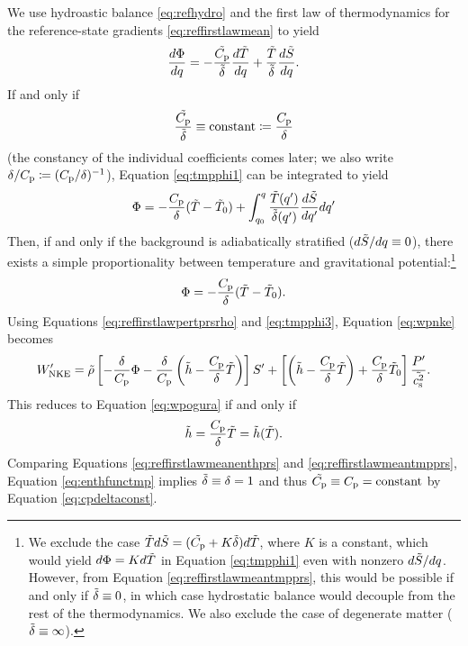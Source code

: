 \documentclass[12pt]{article}
\newcommand{\wpnke}{W^\prime_{\rm NKE}}
\begin{document}
We use hydroastic balance \eqref{eq:refhydro} and the first law of thermodynamics for the reference-state gradients \eqref{eq:reffirstlawmean} to yield
\begin{align}\label{eq:tmpphi1}
	\frac{d\Phi}{dq} = -\frac{\tilde{C_{\rm{p}}}}{\tilde{\delta}}\frac{d\tilde{T}}{dq} + \frac{\tilde{T}}{\tilde{\delta}}\frac{d\tilde{S}}{dq}.
\end{align}
If and only if 
\begin{align}\label{eq:cpdeltaconst}
	\frac{\tilde{C_{\rm{p}}}}{\tilde{\delta}} \equiv \text{constant} \coloneqq \frac{C_{\rm{p}}}{\delta}
\end{align}
(the constancy of the individual coefficients comes later; we also write $\delta/C_{\rm{p}}\coloneqq(C_{\rm{p}}/\delta)^{-1}$), Equation \eqref{eq:tmpphi1} can be integrated to yield
\begin{align}\label{eq:tmpphi2}
	\Phi = -\frac{C_{\rm{p}}}{\delta}(\tilde{T}-\tilde{T}_0) + \int_{q_0}^q\frac{\tilde{T}(q^\prime)}{\tilde{\delta}(q^\prime)}\frac{d\tilde{S}}{dq^\prime}dq^\prime
\end{align}
Then, if and only if the background is adiabatically stratified ($d\tilde{S}/dq\equiv0$), there exists a simple proportionality between temperature and gravitational potential:\footnote{We exclude the case $\tilde{T} d\tilde{S} = (\tilde{C_{\rm{p}}} + K \tilde{\delta})d\tilde{T}$, where $K$ is a constant, which would yield $d\Phi = K d\tilde{T}$ in Equation \eqref{eq:tmpphi1} even with nonzero $d\tilde{S}/dq$. However, from Equation \eqref{eq:reffirstlawmeantmpprs}, this would be possible if and only if $\tilde{\delta}\equiv0$, in which case hydrostatic balance would decouple from the rest of the thermodynamics. We also exclude the case of degenerate matter ($\tilde{\delta}\equiv\infty$).}
\begin{align}\label{eq:tmpphi3}
	\Phi = -\frac{C_{\rm{p}}}{\delta}(\tilde{T}-\tilde{T}_0).
\end{align}
Using Equations \eqref{eq:reffirstlawpertprsrho} and \eqref{eq:tmpphi3}, Equation \eqref{eq:wpnke} becomes
\begin{align}\label{eq:wpnke2}
	\wpnke = \rhotilde\left[-\frac{\delta}{\cpcap}\Phi - \frac{\delta}{\cpcap}\left(\enthtilde - \frac{\cpcap}{\delta}\tmptilde\right)\right] \entrprime +\left[\left(\enthtilde-\frac{\cpcap}{\delta}\tmptilde\right) + \frac{\cpcap}{\delta}\tmptilde_0\right]\frac{\prsprime}{\cssqtilde}.
\end{align}
This reduces to Equation \eqref{eq:wpogura} if and only if 
\begin{align}\label{eq:enthfunctmp}
	\tilde{h} = \frac{C_{\rm{p}}}{\delta}\tilde{T} = \tilde{h}(\tilde{T}). 
\end{align}
Comparing Equations \eqref{eq:reffirstlawmeanenthprs} and \eqref{eq:reffirstlawmeantmpprs}, Equation \eqref{eq:enthfunctmp} implies $\tilde{\delta}\equiv\delta=1$ and thus $\tilde{C_{\rm{p}}}\equiv C_{\rm{p}}=\text{constant}$ by Equation \eqref{eq:cpdeltaconst}.  
\end{document}
